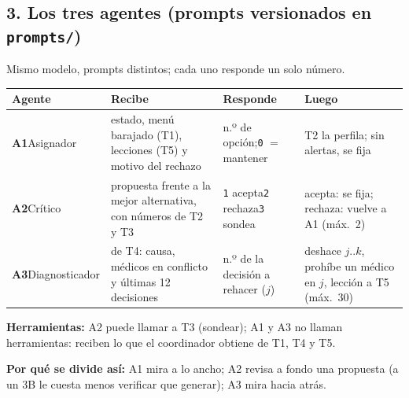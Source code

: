 \documentclass[9pt,a4paper]{extarticle}
\newcommand{\tabfont}{\fontsize{6.7}{7.7}\selectfont\setlength{\tabcolsep}{2.6pt}}
\begin{document}
\begin{multicols}{2}
\section{3. Los tres agentes (prompts versionados en \texttt{prompts/})}
Mismo modelo, prompts distintos; cada uno responde un solo número.\par
{\tabfont
\begin{tabularx}{\linewidth}{@{}L{17.5mm}YL{16.5mm}Y@{}}
\toprule
\textbf{Agente} & \textbf{Recibe} & \textbf{Responde} & \textbf{Luego} \\
\midrule
\textbf{A1}\newline Asignador & estado, menú barajado (T1), lecciones (T5) y motivo del rechazo & n.º de opción;\newline \texttt{0} $=$ mantener & T2 la perfila; sin alertas, se fija \\
\addlinespace[1.5pt]
\textbf{A2}\newline Crítico & propuesta frente a la mejor alternativa, con números de T2 y T3 & \texttt{1} acepta\newline \texttt{2} rechaza\newline \texttt{3} sondea & acepta: se fija; rechaza: vuelve a A1 (máx.\ 2) \\
\addlinespace[1.5pt]
\textbf{A3}\newline Diagnosticador & de T4: causa, médicos en conflicto y últimas 12 decisiones & n.º de la decisión a rehacer ($j$) & deshace $j..k$, prohíbe un médico en $j$, lección a T5 (máx.\ 30) \\
\bottomrule
\end{tabularx}\par}
\textbf{Herramientas:} A2 puede llamar a T3 (sondear); A1 y A3 no llaman herramientas: reciben lo que el coordinador obtiene de T1, T4 y T5.\par
\textbf{Por qué se divide así:} A1 mira a lo ancho; A2 revisa a fondo una propuesta (a un 3B le cuesta menos verificar que generar); A3 mira hacia atrás.


\end{multicols}
\end{document}
